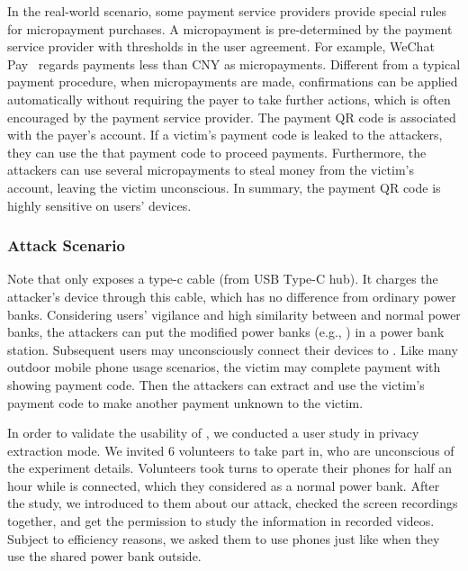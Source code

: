 In the real-world scenario, some payment service providers provide special rules for micropayment purchases. 
A micropayment is pre-determined by the payment service provider with thresholds in the user agreement. 
For example, WeChat Pay~\cite{Wechat-pay} regards payments less than CNY  as micropayments. 
Different from a typical payment procedure, when micropayments are made, confirmations can be applied automatically without requiring the payer to take further actions, which is often encouraged by the payment service provider.
The payment QR code is associated with the payer's account. 
If a victim's payment code is leaked to the attackers, they can use the that payment code to proceed payments. 
Furthermore, the attackers can use several micropayments to steal money from the victim's account, leaving the victim unconscious. 
In summary, the payment QR code is highly sensitive on users' devices.

\subsubsection{Attack Scenario}

Note that \tool only exposes a type-c cable (from USB Type-C hub).
It charges the attacker's device through this cable, which has no difference from ordinary power banks. 
Considering users' vigilance and high similarity between \tool and normal power banks, the attackers can put the modified power banks (e.g., \tool) in a power bank station.
Subsequent users may unconsciously connect their devices to \tool.
Like many outdoor mobile phone usage scenarios, the victim may complete payment with showing payment code. 
Then the attackers can extract and use the victim's payment code to make another payment unknown to the victim.

In order to validate the usability of \tool, we conducted a user study in privacy extraction mode. 
We invited 6 volunteers to take part in, who are unconscious of the experiment details.
Volunteers took turns to operate their phones for half an hour while \tool is connected, which they considered as a normal power bank.
After the study, we introduced to them about our attack, checked the screen recordings together, and get the permission to study the information in recorded videos.
Subject to efficiency reasons, we asked them to use phones just like when they use the shared power bank outside.


